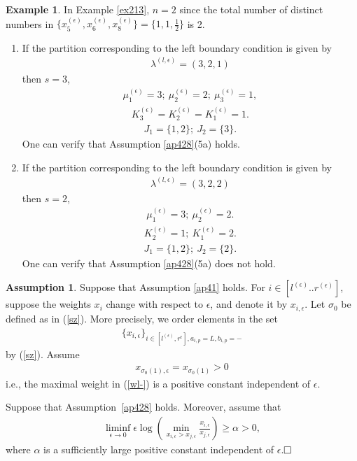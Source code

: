 \documentclass[11pt]{amsart}
\theoremstyle{plain}
\theoremstyle{definition}
\newtheorem{example}[theorem]{Example}
\newtheorem{assumption}[theorem]{Assumption}
\theoremstyle{remark}
\numberwithin{equation}{section}
\numberwithin{theorem}{section}
\numberwithin{figure}{section}
\begin{document}
\begin{example}In Example \ref{ex213}, $n=2$ since the total number of distinct numbers in 
$\{x_5^{(\epsilon)},x_6^{(\epsilon)},x_8^{(\epsilon)}\}=\{1,1,\frac{1}{2}\}$ is 2. 
\begin{enumerate}
\item If the partition corresponding to the left boundary condition is given by
\begin{align*}
\lambda^{(l,\epsilon)}=(3,2,1)
\end{align*}
then $s=3$, 
\begin{align*}
\mu_1^{(\epsilon)}=3;\ \mu_2^{(\epsilon)}=2;\ \mu_3^{(\epsilon)}=1,
\end{align*}
\begin{align*}
K_3^{(\epsilon)}=K_2^{(\epsilon)}=K_1^{(\epsilon)}=1.
\end{align*}
\begin{align*}
J_1=\{1,2\};\ J_2=\{3\}.
\end{align*}
One can verify that Assumption \ref{ap428}(5a) holds.
\item If the partition corresponding to the left boundary condition is given by
\begin{align*}
\lambda^{(l,\epsilon)}=(3,2,2)
\end{align*}
then $s=2$, 
\begin{align*}
\mu_1^{(\epsilon)}=3;\ \mu_2^{(\epsilon)}=2.
\end{align*}
\begin{align*}
K_2^{(\epsilon)}=1;\ K_1^{(\epsilon)}=2.
\end{align*}
\begin{align*}
J_1=\{1,2\};\ J_2=\{2\}.
\end{align*}
One can verify that Assumption \ref{ap428}(5a) does not hold.
\end{enumerate}
\end{example}

\begin{assumption}\label{ap32}Suppose that Assumption \ref{ap41} holds. For $i\in[l^{(\epsilon)}..r^{(\epsilon)}]$, suppose the weights $x_i$ change with respect to $\epsilon$, and denote it by $x_{i,\epsilon}$. Let $\sigma_0$ be defined as in (\ref{sz}). More precisely, we order elements in the set
\begin{eqnarray}
\{x_{i,\epsilon}\}_{i\in[l^{(\epsilon)},r^{\epsilon}],a_{i,p}=L,b_{i,p}=-}\label{wl-}
\end{eqnarray}
by (\ref{sz}).
Assume 
\begin{eqnarray*}
x_{\sigma_0(1),\epsilon}=x_{\sigma_0(1)}>0
\end{eqnarray*}
i.e., the maximal weight in (\ref{wl-}) is a positive constant independent of $\epsilon$.

Suppose that Assumption~\ref{ap428} holds. Moreover, assume that
 \begin{eqnarray*}
\liminf_{\epsilon\rightarrow 0} \epsilon\log\left(\min_{x_{i,\epsilon}>x_{j,\epsilon}}\frac{x_{i,\epsilon}}{x_{j,\epsilon}}\right)\geq \alpha>0,
\end{eqnarray*}
where $\alpha$ is a sufficiently large positive constant independent of $\epsilon$.$\hfill\Box$
\end{assumption}
\end{document}
